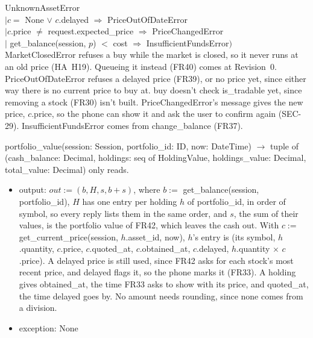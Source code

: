 \documentclass[12pt, titlepage]{article}
\begin{document}
\begin{itemize}
    UnknownAssetError\\
  \hspace*{1em}$\mid c =$ None $\lor$ $c$.delayed $\Rightarrow$
    PriceOutOfDateError\\
  \hspace*{1em}$\mid c$.price $\neq$ request.expected\_price $\Rightarrow$
    PriceChangedError\\
  \hspace*{1em}$\mid$ get\_balance(session, $p$) $<$ cost $\Rightarrow$
    InsufficientFundsError$)$\\
  MarketClosedError refuses a buy while the market is closed, so it never
  runs at an old price (HA~H19). Queueing it instead (FR40) comes at
  Revision~0. PriceOutOfDateError refuses a delayed price (FR39), or no price yet, since
  either way there is no current price to buy at. buy doesn't check
  is\_tradable yet, since removing a stock (FR30) isn't built.
  PriceChangedError's message gives the new price, $c$.price, so the phone can
  show it and ask the user to confirm again (SEC-29). InsufficientFundsError
  comes from change\_balance (FR37).
\end{itemize}

\noindent portfolio\_value(session: Session, portfolio\_id: ID, now: DateTime)
$\rightarrow$ tuple of (cash\_balance: Decimal, holdings: seq of HoldingValue,
holdings\_value: Decimal, total\_value: Decimal) only reads.
\begin{itemize}
\item output: $out := (b, H, s, b + s)$, where $b :=$ get\_balance(session,
  portfolio\_id), $H$ has one entry per holding $h$ of portfolio\_id, in order
  of symbol, so every reply lists them in the same order, and $s$, the sum
  of their values, is the portfolio value of FR42, which leaves the cash out.
  With $c :=$
  get\_current\_price(session, $h$.asset\_id, now), $h$'s entry is (its symbol,
  $h$.quantity, $c$.price, $c$.quoted\_at, $c$.obtained\_at, $c$.delayed,
  $h$.quantity $\times$
  $c$.price). A delayed price is still used, since FR42 asks for each stock's
  most recent price, and delayed flags it, so the phone marks it (FR33). A holding gives
  obtained\_at, the time FR33 asks to show with its price, and quoted\_at,
  the time delayed goes by. No amount needs rounding, since none comes from a division.
\item exception: None
\end{itemize}

\newpage
\end{document}
